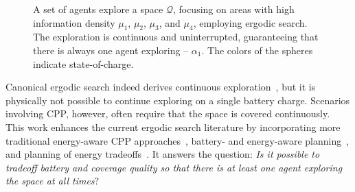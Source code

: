 \documentclass[letterpaper,10pt,conference,twoside]{IEEEtran}
\theoremstyle{definition}
\begin{document}
\begin{figure}[t!]
  \centering
  \hspace*{-.08cm}
  \caption{A set of agents explore a space $\mathcal{Q}$, focusing on areas with high information density $\mu_1$, $\mu_2$, $\mu_3$, and $\mu_4$, employing ergodic search. The exploration is continuous and uninterrupted, guaranteeing that there is always one agent exploring -- $\alpha_1$. The colors of the spheres indicate state-of-charge.}
  \label{fig:abs}
  \vspace*{-.3cm}
\end{figure}

Canonical ergodic search indeed derives continuous exploration~\cite{%
miller2013trajectory,miller2016ergodic,abraham2017ergodic}, but it is physically not possible to continue exploring on a single battery charge. 
Scenarios involving CPP, however, often require that the space is covered continuously.
This work enhances the current ergodic search literature by incorporating more traditional energy-aware CPP approaches~\cite{difranco2015energy,difranco2016coverage,shnaps2016online,cabreira2018energy,wei2018coverage,jensen2021near}, battery- and energy-aware planning~\cite{mei2004energy,mei2005case,kim2005energy,seewald2022energy}, and planning of energy tradeoffs~\cite{ondruska2015scheduled,sudhakar2020balancing}. It answers the question: \textit{Is it possible to tradeoff battery and coverage quality so that there is at least one agent exploring the space at all times}?

\end{document}
